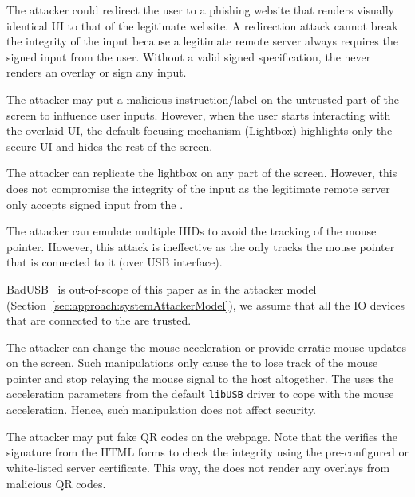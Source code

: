 \parasave
{} The attacker could redirect the user to a phishing website that renders visually identical UI to that of the legitimate website. A redirection attack cannot break the integrity of the input because a legitimate remote server always requires the signed input from the user. Without a valid signed specification, the \device never renders an overlay or sign any input. 

\parasave
{} The attacker may put a malicious instruction/label on the untrusted part of the screen to influence user inputs. However, when the user starts interacting with the overlaid UI, the default focusing mechanism (Lightbox) highlights only the secure UI and hides the rest of the screen. 

\parasave
{} The attacker can replicate the lightbox on any part of the screen. However, this does not compromise the integrity of the input as the legitimate remote server only accepts signed input from the \device. 

\parasave
{} The attacker can emulate multiple HIDs to avoid the tracking of the mouse pointer. However, this attack is ineffective as the \device only tracks the mouse pointer that is connected to it (over USB interface). 

\parasave
{} BadUSB~\cite{badUSB} is out-of-scope of this paper as in the attacker model (Section~\ref{sec:approach:systemAttackerModel}), we assume that all the IO devices that are connected to the \device are trusted.

\parasave
{} The attacker can change the mouse acceleration or provide erratic mouse updates on the screen. Such manipulations only cause the \device to lose track of the mouse pointer and stop relaying the mouse signal to the host altogether. The \device uses the acceleration parameters from the default \texttt{libUSB} driver to cope with the mouse acceleration. Hence, such manipulation does not affect security.

\parasave
{} The attacker may put fake QR codes on the webpage. Note that the \device verifies the signature from the HTML forms to check the integrity using the pre-configured or white-listed server certificate. This way, the \device does not render any overlays from malicious QR codes.

